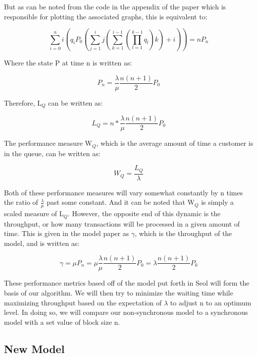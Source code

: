 \documentclass[conference]{IEEEtran}
\begin{document}
But as can be noted from the code in the appendix of the paper which is responsible for plotting 
the associated graphs, this is equivalent to: 

\begin{equation}
\sum_{i=0}^ni(q_iP_0(\sum_{j=1}^ij(\sum_{k=1}^{i-1}(\prod_{l=1}^{k-1}q_l)k)+i))=nP_n\label{nPn_eq}
\end{equation}

Where the state P at time n is written as:

\begin{equation}
P_n=\frac{\lambda}{\mu}\frac{n(n+1)}{2}P_0\label{Pn_eq}
\end{equation}

Therefore, L$_Q$ can be written as:

\begin{equation}
L_Q=n\ast\frac{\lambda}{\mu}\frac{n(n+1)}{2}P_0\label{LQ2_eq}
\end{equation}

The performance measure W$_Q$, which is the average amount of time a customer is in the queue, 
can be written as:

\begin{equation}
W_Q=\frac{L_Q}{\lambda}\label{WQ_eq}
\end{equation}

Both of these performance measures will vary somewhat constantly by n times the ratio of 
$\frac{\lambda}{\mu}$ past some constant. And it can be noted that W$_Q$ is simply a scaled 
measure of L$_Q$. However, the opposite end of this dynamic is the throughput, or how many 
transactions will be processed in a given amount of time. This is given in the model paper as 
$\gamma$, which is the throughput of the model, and is written as:

\begin{equation}
\gamma=\mu P_n=\mu\frac{\lambda}{\mu}\frac{n(n+1)}{2}P_0=\lambda\frac{n(n+1)}{2}P_0\label{gamma_eq}
\end{equation}

These performance metrics based off of the model put forth in Seol\cite{2020_ACM_Seol} will form the basis 
of our algorithm. We will then try to minimize the waiting time while maximizing throughput based 
on the expectation of $\lambda$ to adjust n to an optimum level. In doing so, we will compare our 
non-synchronous model to a synchronous model with a set value of block size n. 

\subsection{New Model}\label{new_model}
\end{document}
